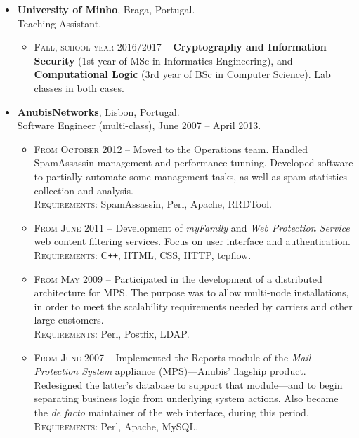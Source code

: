 \documentclass[a4paper, 10pt]{extarticle}
\newenvironment{topic}[1]
   {{\noindent\large\bfseries\raisebox{0pt}[\height][1ex]{#1}\hrule\par}%
    \begin{list}{}{%
       \setlength{\leftmargin}{.0cm}}\item[]}
   {\end{list}\medskip}
\begin{document}
\begin{topic}{Professional Experience}
  \begin{itemize}[leftmargin=*]
    \item {\bfseries University of Minho}, Braga, Portugal.\\
			Teaching Assistant.
			\begin{itemize}
				\item {\scshape Fall, school year 2016/2017} -- \textbf{Cryptography and 
					Information Security} (1st year of MSc in Informatics Engineering), 
					and \textbf{Computational Logic} (3rd year of BSc in Computer 
					Science). Lab classes in both cases.
			\end{itemize}
    \item {\bfseries AnubisNetworks}, Lisbon, Portugal.\\
      Software Engineer (multi-class), June 2007 -- April 2013.
      \begin{itemize}
				\item {\scshape From October 2012} -- Moved to the Operations team. 
					Handled SpamAssassin management and performance tunning. Developed 
					software to partially automate some management tasks, as well as spam 
					statistics collection and analysis.\\
					{\scshape Requirements}: SpamAssassin, Perl, Apache, RRDTool.
				\item {\scshape From June 2011} -- Development of \emph{myFamily} and \emph{Web 
					Protection Service} web content filtering services. Focus on user 
					interface and authentication.\\
					{\scshape Requirements}: C{}\verb!++!, HTML, CSS, HTTP, tcpflow.
				\item {\scshape From May 2009} -- Participated in the development of a distributed 
					architecture for MPS. The purpose was to allow multi-node 
					installations, in order to meet the scalability requirements needed by 
					carriers and other large customers.\\
					{\scshape Requirements}: Perl, Postfix, LDAP.
				\item {\scshape From June 2007} -- Implemented the Reports 
					module of the \emph{Mail Protection 
					System}\textsuperscript{\texttrademark} appliance (MPS)---Anubis' 
					flagship product. Redesigned the latter's database to support that 
					module---and to begin separating business logic from underlying system 
					actions. Also became the \emph{de facto} maintainer of the web 
					interface, during this period.\\
					{\scshape Requirements}: Perl, Apache, MySQL.
      \end{itemize}
  \end{itemize}
\end{topic}
\end{document}
